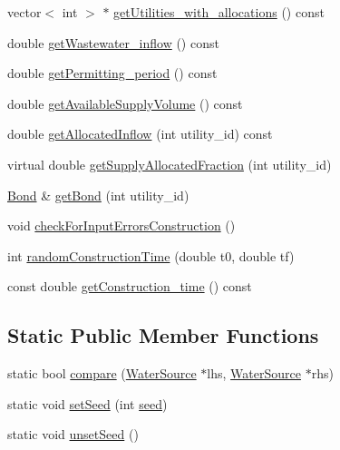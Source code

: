 \begin{DoxyCompactItemize}
\item 
vector$<$ int $>$ $\ast$ \mbox{\hyperlink{classWaterSource_a7d6beb9fce5be21a3777fee88f045e62_a7d6beb9fce5be21a3777fee88f045e62}{get\+Utilities\+\_\+with\+\_\+allocations}} () const
\item 
double \mbox{\hyperlink{classWaterSource_aee22325e6af0e3c804ddbd9a3505be05_aee22325e6af0e3c804ddbd9a3505be05}{get\+Wastewater\+\_\+inflow}} () const
\item 
double \mbox{\hyperlink{classWaterSource_aa21d3f1c87ced40c2b673d9e43d99176_aa21d3f1c87ced40c2b673d9e43d99176}{get\+Permitting\+\_\+period}} () const
\item 
double \mbox{\hyperlink{classWaterSource_af6445a2dd3764907bcb9a37d4647f910_af6445a2dd3764907bcb9a37d4647f910}{get\+Available\+Supply\+Volume}} () const
\item 
double \mbox{\hyperlink{classWaterSource_a63b1a410b47710db049e2b2e9c3c39a0_a63b1a410b47710db049e2b2e9c3c39a0}{get\+Allocated\+Inflow}} (int utility\+\_\+id) const
\item 
virtual double \mbox{\hyperlink{classWaterSource_a71cb8bd481bbce0089aa78dcd1c3309a_a71cb8bd481bbce0089aa78dcd1c3309a}{get\+Supply\+Allocated\+Fraction}} (int utility\+\_\+id)
\item 
\mbox{\hyperlink{classBond}{Bond}} \& \mbox{\hyperlink{classWaterSource_a22f89ebf1115de192df588a4fd83c671_a22f89ebf1115de192df588a4fd83c671}{get\+Bond}} (int utility\+\_\+id)
\item 
void \mbox{\hyperlink{classWaterSource_a47bc2006a1ef6ea4429d56a24319940f_a47bc2006a1ef6ea4429d56a24319940f}{check\+For\+Input\+Errors\+Construction}} ()
\item 
int \mbox{\hyperlink{classWaterSource_aebc6985952d3e69f0d8ae1d0498a1ffe_aebc6985952d3e69f0d8ae1d0498a1ffe}{random\+Construction\+Time}} (double t0, double tf)
\item 
const double \mbox{\hyperlink{classWaterSource_ac1e8880f0aeb56b2728e253d3500ef40_ac1e8880f0aeb56b2728e253d3500ef40}{get\+Construction\+\_\+time}} () const
\end{DoxyCompactItemize}
\subsection*{Static Public Member Functions}
\begin{DoxyCompactItemize}
\item 
static bool \mbox{\hyperlink{classWaterSource_a7a1325107c74bb0ea553dc3547204e01_a7a1325107c74bb0ea553dc3547204e01}{compare}} (\mbox{\hyperlink{classWaterSource}{Water\+Source}} $\ast$lhs, \mbox{\hyperlink{classWaterSource}{Water\+Source}} $\ast$rhs)
\item 
static void \mbox{\hyperlink{classWaterSource_a741c60afc9dafaae318ce7c99f4fd327_a741c60afc9dafaae318ce7c99f4fd327}{set\+Seed}} (int \mbox{\hyperlink{classWaterSource_abaf6cb0ecca08c87428ad516f11f8c2e_abaf6cb0ecca08c87428ad516f11f8c2e}{seed}})
\item 
static void \mbox{\hyperlink{classWaterSource_a4bd60dafcc0b18f1c7a415f489bb220a_a4bd60dafcc0b18f1c7a415f489bb220a}{unset\+Seed}} ()
\end{DoxyCompactItemize}

